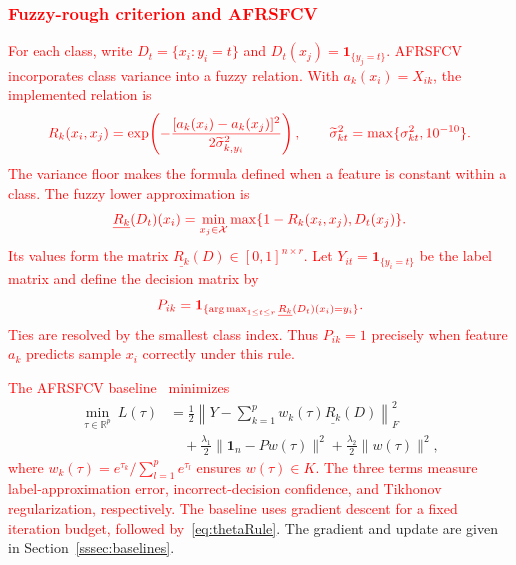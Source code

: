 \documentclass[]{interact}
\theoremstyle{plain}
\theoremstyle{definition}
\theoremstyle{remark}
\newcommand{\R}{\mathbb{R}}
\DeclareMathOperator*{\argmax}{arg\,max}
\begin{document}
\subsubsection{\textcolor{red}{Fuzzy-rough criterion and AFRSFCV}}\label{ssec:afrsfcv}\label{sssec:afrsfcv-inputs}\label{sssec:afrsfcv-model}
\leavevmode\textcolor{red}{For each class, write $D_t=\{x_i:y_i=t\}$ and $D_t(x_j)=\mathbf1_{\{y_j=t\}}$. AFRSFCV incorporates class variance into a fuzzy relation. With $a_k(x_i)=X_{ik}$, the implemented relation is}
\begin{equation}\label{eq:simRel}\textcolor{red}{
R_k(x_i,x_j)=\exp\!\left(-\frac{[a_k(x_i)-a_k(x_j)]^2}{2\widetilde\sigma_{k,y_i}^2}\right),
\qquad \widetilde\sigma_{kt}^2=\max\{\sigma_{kt}^2,10^{-10}\}.
}\end{equation}
\leavevmode\textcolor{red}{The variance floor makes the formula defined when a feature is constant within a class. The fuzzy lower approximation is}
\begin{equation}\label{eq:lower}\textcolor{red}{
\underline{R_k}(D_t)(x_i)=\min_{x_j\in\mathcal{X}}\max\{1-R_k(x_i,x_j),D_t(x_j)\}.
}\end{equation}
\leavevmode\textcolor{red}{Its values form the matrix $\underline{R_k}(D)\in[0,1]^{n\times r}$. Let $Y_{it}=\mathbf1_{\{y_i=t\}}$ be the label matrix and define the decision matrix by}
\begin{equation}\label{eq:Pmat}\textcolor{red}{
P_{ik}=\mathbf1_{\{\argmax_{1\le t\le r}\underline{R_k}(D_t)(x_i)=y_i\}}.
}\end{equation}
\leavevmode\textcolor{red}{Ties are resolved by the smallest class index. Thus $P_{ik}=1$ precisely when feature $a_k$ predicts sample $x_i$ correctly under this rule.}

\leavevmode\textcolor{red}{The AFRSFCV baseline~\citep{wang2026afrsfcv} minimizes}
\begin{equation}\label{eq:afrsfcvLoss}
\begin{split}
\min_{\tau\in\R^p}\ L(\tau)
&=\frac12\left\|Y-\sum_{k=1}^{p}w_k(\tau)\underline{R_k}(D)\right\|_F^2\\
&\quad+\frac{\lambda_1}{2}\|\mathbf1_n-Pw(\tau)\|^2+\frac{\lambda_2}{2}\|w(\tau)\|^2,
\end{split}
\end{equation}
\leavevmode\textcolor{red}{where $w_k(\tau)=e^{\tau_k}/\sum_{l=1}^{p}e^{\tau_l}$ ensures $w(\tau)\in K$. The three terms measure label-approximation error, incorrect-decision confidence, and Tikhonov regularization, respectively. The baseline uses gradient descent for a fixed iteration budget, followed by~\eqref{eq:thetaRule}}. The gradient and update are given in Section~\ref{sssec:baselines}.
\end{document}
